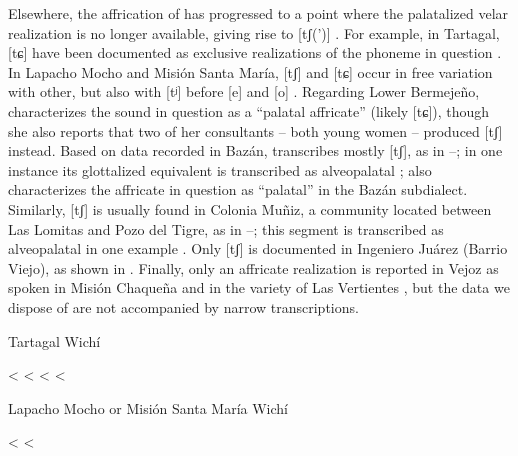 Elsewhere, the affrication of  has progressed to a point where the palatalized velar realization is no longer available, giving rise to [tʃ(’)] \recind [tɕ(’)]. For example, in Tartagal, [tɕ] \recind [tʃ] have been documented as exclusive realizations of the phoneme in question . In Lapacho Mocho and Misión Santa María, [tʃ] and [tɕ] occur in free variation with other, but also with [tʲ] before [e] and [o] . Regarding Lower Bermejeño, \citet[51]{VN14} characterizes the sound in question as a “palatal affricate” (likely [tɕ]), though she also reports that two of her consultants -- both young women -- produced [tʃ] instead. Based on data recorded in Bazán, \citet{MC09} transcribes mostly [tʃ], as in –; in one instance its glottalized equivalent is transcribed as alveopalatal ; \citet{JB09} also characterizes the affricate in question as “palatal” in the Bazán subdialect. Similarly, [tʃ] is usually found in Colonia Muñiz, a community located between Las Lomitas and Pozo del Tigre, as in –; this segment is transcribed as alveopalatal in one example . Only [tʃ] is documented in Ingeniero Juárez (Barrio Viejo), as shown in . Finally, only an affricate realization is reported in Vejoz as spoken in Misión Chaqueña and in the variety of Las Vertientes \citep[160]{VU74,MG-MELO15,AFG-SS-09}, but the data we dispose of are not accompanied by narrow transcriptions.

\ea\label{wi:kj:tar}
Tartagal Wichí \citep[359--360, 366]{LCB15}\\
    \begin{xlist}
        \ex {} < 
        \ex {} < 
        \ex {} < 
        \ex {} < 
    \end{xlist}
\z

\ea\label{wi:kj:lmmsm}
Lapacho Mocho or Misión Santa María Wichí \citep[160]{AFG-SS-09}\\
    \begin{xlist}
        \ex {} \recind {} \recind {} < 
        \ex {} \recind {} <~
    \end{xlist}
\z

